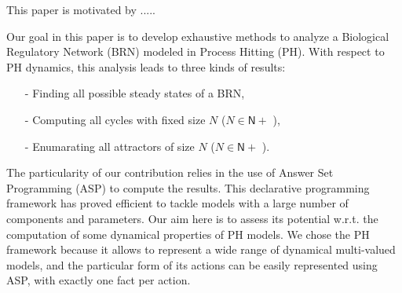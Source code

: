 This paper is motivated by ..... 

Our goal in this paper is to develop exhaustive methods to analyze a Biological Regulatory Network (BRN) modeled in Process Hitting (PH). With respect to PH dynamics, this analysis leads to three kinds of results:
\begin{itemize}
\item[-] Finding all possible steady states of a BRN,
\item[-] Computing all cycles with fixed size $N$ ($N \in \mathsf{N}+$ ),
\item[-] Enumarating all attractors of size $N$ ($N \in \mathsf{N}+$ ).
\end{itemize}
 The particularity of our contribution relies in the use of Answer Set Programming
(ASP) \cite{baral2003knowledge}
to compute the results.
This declarative programming framework has proved efficient
to tackle models with a large number of components and parameters.
Our aim here is to assess its potential w.r.t. the computation
of some dynamical properties of PH models.
We chose the PH framework because it allows to represent a wide range of dynamical multi-valued models, 
and the particular form of its actions
can be easily represented using ASP,
with exactly one fact per action.